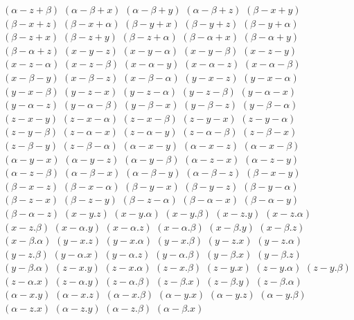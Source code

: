 $ (\alpha - z + \beta) $
$ (\alpha - \beta + x) $
$ (\alpha - \beta + y) $
$ (\alpha - \beta + z) $
$ (\beta - x + y) $
$ (\beta - x + z) $
$ (\beta - x + \alpha) $
$ (\beta - y + x) $
$ (\beta - y + z) $
$ (\beta - y + \alpha) $
$ (\beta - z + x) $
$ (\beta - z + y) $
$ (\beta - z + \alpha) $
$ (\beta - \alpha + x) $
$ (\beta - \alpha + y) $
$ (\beta - \alpha + z) $
$ (x - y - z) $
$ (x - y - \alpha) $
$ (x - y - \beta) $
$ (x - z - y) $
$ (x - z - \alpha) $
$ (x - z - \beta) $
$ (x - \alpha - y) $
$ (x - \alpha - z) $
$ (x - \alpha - \beta) $
$ (x - \beta - y) $
$ (x - \beta - z) $
$ (x - \beta - \alpha) $
$ (y - x - z) $
$ (y - x - \alpha) $
$ (y - x - \beta) $
$ (y - z - x) $
$ (y - z - \alpha) $
$ (y - z - \beta) $
$ (y - \alpha - x) $
$ (y - \alpha - z) $
$ (y - \alpha - \beta) $
$ (y - \beta - x) $
$ (y - \beta - z) $
$ (y - \beta - \alpha) $
$ (z - x - y) $
$ (z - x - \alpha) $
$ (z - x - \beta) $
$ (z - y - x) $
$ (z - y - \alpha) $
$ (z - y - \beta) $
$ (z - \alpha - x) $
$ (z - \alpha - y) $
$ (z - \alpha - \beta) $
$ (z - \beta - x) $
$ (z - \beta - y) $
$ (z - \beta - \alpha) $
$ (\alpha - x - y) $
$ (\alpha - x - z) $
$ (\alpha - x - \beta) $
$ (\alpha - y - x) $
$ (\alpha - y - z) $
$ (\alpha - y - \beta) $
$ (\alpha - z - x) $
$ (\alpha - z - y) $
$ (\alpha - z - \beta) $
$ (\alpha - \beta - x) $
$ (\alpha - \beta - y) $
$ (\alpha - \beta - z) $
$ (\beta - x - y) $
$ (\beta - x - z) $
$ (\beta - x - \alpha) $
$ (\beta - y - x) $
$ (\beta - y - z) $
$ (\beta - y - \alpha) $
$ (\beta - z - x) $
$ (\beta - z - y) $
$ (\beta - z - \alpha) $
$ (\beta - \alpha - x) $
$ (\beta - \alpha - y) $
$ (\beta - \alpha - z) $
$ (x - y . z) $
$ (x - y . \alpha) $
$ (x - y . \beta) $
$ (x - z . y) $
$ (x - z . \alpha) $
$ (x - z . \beta) $
$ (x - \alpha . y) $
$ (x - \alpha . z) $
$ (x - \alpha . \beta) $
$ (x - \beta . y) $
$ (x - \beta . z) $
$ (x - \beta . \alpha) $
$ (y - x . z) $
$ (y - x . \alpha) $
$ (y - x . \beta) $
$ (y - z . x) $
$ (y - z . \alpha) $
$ (y - z . \beta) $
$ (y - \alpha . x) $
$ (y - \alpha . z) $
$ (y - \alpha . \beta) $
$ (y - \beta . x) $
$ (y - \beta . z) $
$ (y - \beta . \alpha) $
$ (z - x . y) $
$ (z - x . \alpha) $
$ (z - x . \beta) $
$ (z - y . x) $
$ (z - y . \alpha) $
$ (z - y . \beta) $
$ (z - \alpha . x) $
$ (z - \alpha . y) $
$ (z - \alpha . \beta) $
$ (z - \beta . x) $
$ (z - \beta . y) $
$ (z - \beta . \alpha) $
$ (\alpha - x . y) $
$ (\alpha - x . z) $
$ (\alpha - x . \beta) $
$ (\alpha - y . x) $
$ (\alpha - y . z) $
$ (\alpha - y . \beta) $
$ (\alpha - z . x) $
$ (\alpha - z . y) $
$ (\alpha - z . \beta) $
$ (\alpha - \beta . x) $
